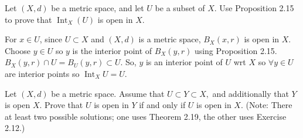 \documentclass[12pt,letterpaper,boxed]{hmcpset}
\DeclareMathOperator{\Int}{Int}
\begin{document}
\begin{problem}[Exercise 2.16.]
Let $(X, d)$ be a metric space, and let $U$ be a subset of $X$. Use Proposition 2.15 to prove that $\Int_{X}(U)$ is open in $X$.
\end{problem}
\begin{solution}
For $x \in U$, since $U\subset X$ and $(X,d)$ is a metric space, $B_X(x, r)$ is open in $X$. Choose $y\in U$ so $y$ is the interior point of $B_X(y,r)$ using Proposition 2.15. $B_X(y, r)\cap U = B_U(y, r) \subset U.$ So, $y$ is an interior point of $U$ wrt $X$ so $\forall y \in U$ are interior points so $\Int_X U = U.$
\end{solution}

\begin{problem}[Exercise 2.20.]
Let $(X, d)$ be a metric space. Assume that $U\subset Y\subset X,$ and additionally that $Y$ is open $X$. Prove that $U$ is open in $Y$ if and only if $U$ is open in $X$. (Note: There at least two possible solutions; one uses Theorem 2.19, the other uses Exercise 2.12.)
\end{problem}
\begin{solution}

\end{solution}
\end{document}
